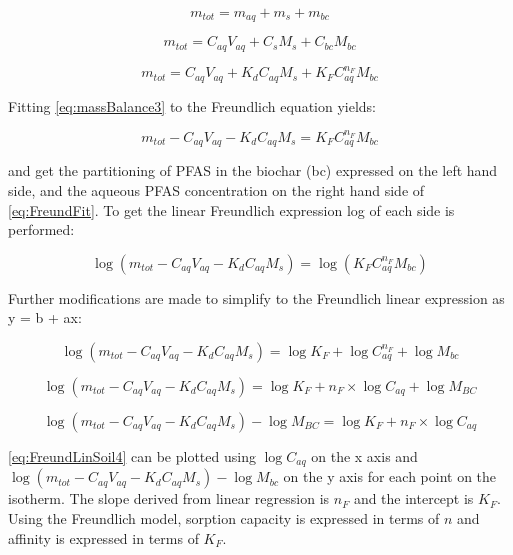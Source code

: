 \begin{equation} \label{eq:massBalance1}
    m_{tot} = m_{aq} + m_{s} + m_{bc}
\end{equation}

\begin{equation} \label{eq:massBalance2}
     m_{tot} = C_{aq}V_{aq} + C_sM_s + C_{bc}M_{bc}
\end{equation}

\begin{equation} \label{eq:massBalance3}
     m_{tot} = C_{aq}V_{aq} + K_dC_{aq}M_s + K_{F}C_{aq}^{n_F}M_{bc}
\end{equation}
 
Fitting \cref{eq:massBalance3} to the Freundlich equation yields:

\begin{equation} \label{eq:FreundFit}
    m_{tot} - C_{aq}V_{aq} - K_dC_{aq}M_s = K_{F}C_{aq}^{n_F}M_{bc}
\end{equation}

and get the partitioning of PFAS in the biochar (bc) expressed on the left hand side, and the aqueous PFAS concentration on the right hand side of \cref{eq:FreundFit}. To get the linear Freundlich expression log of each side is performed:

\begin{equation} \label{eq:FreundLinSoil1}
   \log (m_{tot} - C_{aq}V_{aq} - K_dC_{aq}M_s) = \log (K_{F}C_{aq}^{n_F}M_{bc})
\end{equation}

Further modifications are made to simplify to the Freundlich linear expression as y = b + ax:

\begin{equation} \label{eq:FreundLinSoil2}
    \log (m_{tot} - C_{aq}V_{aq} - K_dC_{aq}M_s) = \log K_{F} + \log C_{aq}^{n_F} + \log M_{bc}
\end{equation}

\begin{equation} \label{eq:FreundLinSoil3}
    \log (m_{tot} - C_{aq}V_{aq} - K_dC_{aq}M_s) = \log K_{F} + n_F \times \log C_{aq} + \log M_{BC}
\end{equation}

\begin{equation} \label{eq:FreundLinSoil4}
    \log (m_{tot} - C_{aq}V_{aq} - K_dC_{aq}M_s) - \log M_{BC} = \log K_{F} + n_F \times \log C_{aq}  
\end{equation}

\cref{eq:FreundLinSoil4} can be plotted using $\log C_{aq}$ on the x axis and $\log (m_{tot} - C_{aq}V_{aq} - K_dC_{aq}M_s) - \log M_{bc}$ on the y axis for each point on the isotherm. The slope derived from linear regression is $n_F$ and the intercept is $K_F$. Using the Freundlich model, sorption capacity is expressed in terms of \(n\) and affinity is expressed in terms of \(K_F\). 
